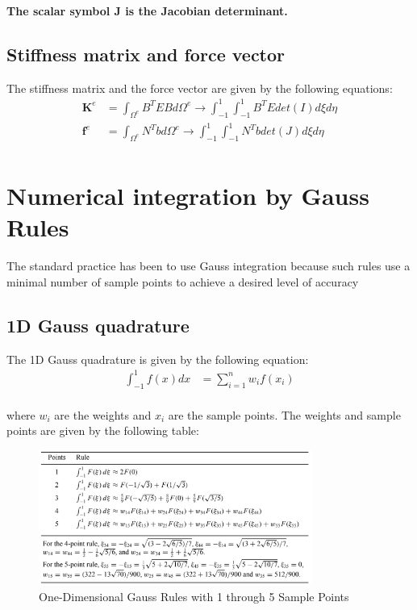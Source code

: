 \documentclass{article}  %
\begin{document}
\textbf{The scalar symbol J is the Jacobian determinant.}

\subsection{Stiffness matrix and force vector}
The stiffness matrix and the force vector are given by the following equations:
\begin{align}
  \mathbf{K}^e &= \int_{\Omega^e} B^T E B d\Omega^e \rightarrow \int_{-1}^{1}\int_{-1}^{1} B^T E det(I)d\xi d\eta\\
  \mathbf{f}^e &= \int_{\Omega^e} N^T b d\Omega^e \rightarrow \int_{-1}^{1}\int_{-1}^{1} N^T b det(J)d\xi d\eta\\
\end{align}


\section{Numerical integration by Gauss Rules}
The standard practice has been to use Gauss integration because such rules use a minimal number of sample points to achieve a desired level of accuracy
\subsection{1D Gauss quadrature}
The 1D Gauss quadrature is given by the following equation:
\begin{align}
  \int_{-1}^{1} f(x) dx & = \sum_{i=1}^{n} w_i f(x_i) \\
\end{align}

where $w_i$ are the weights and $x_i$ are the sample points. The weights and sample points are given by the following table:
\begin{figure}[h]
    \centering
    \includegraphics[width=0.8\textwidth]{Graphics/gauss_points.PNG}
    \caption{One-Dimensional Gauss Rules with 1 through 5 Sample Points}
    \label{fig:gauss_1d}
\end{figure}
\end{document}
